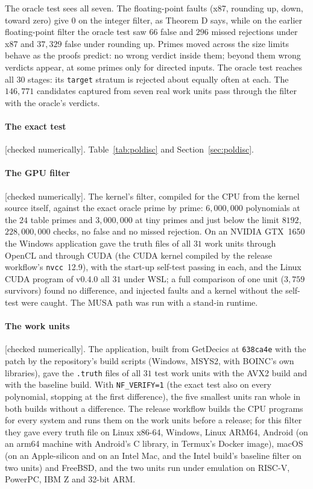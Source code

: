 \documentclass[10pt,a4paper]{article}
\newcommand{\code}[1]{\texttt{#1}}
\newcommand{\stnum}{\textsf{\small[checked numerically]}\xspace}
\theoremstyle{plain}
\theoremstyle{definition}
\begin{document}
The oracle test sees all seven.  The floating-point faults (x87, rounding up, down, toward zero) give $0$ on the integer filter, as Theorem D says, while on the
earlier floating-point filter the oracle test saw $66$ false and $296$ missed rejections under x87 and $37{,}329$ false under rounding up.  Primes moved across the size
limits behave as the proofs predict: no wrong verdict inside them; beyond them wrong verdicts appear, at some primes only for directed inputs.  The oracle test
reaches all $30$ stages: its \code{target} stratum is rejected about equally often at each.  The $146{,}771$ candidates captured from seven real work units pass
through the filter with the oracle's verdicts.

\paragraph{The exact test} \stnum.  Table~\ref{tab:poldisc} and Section~\ref{sec:poldisc}.

\paragraph{The GPU filter} \stnum.  The kernel's filter, compiled for the CPU from the kernel source itself, against the exact oracle prime by prime:
$6{,}000{,}000$ polynomials at the $24$ table primes and $3{,}000{,}000$ at tiny primes and just below the limit $8192$, $228{,}000{,}000$ checks, no false and no
missed rejection.  On an NVIDIA GTX~1650 the Windows application gave the truth files of all $31$ work units through OpenCL and through CUDA (the CUDA kernel
compiled by the release workflow's \code{nvcc}~12.9), with the start-up self-test passing in each, and the Linux CUDA program of v0.4.0 all $31$ under WSL; a full
comparison of one unit ($3{,}759$ survivors) found no difference, and injected faults and a kernel without the self-test were caught.  The MUSA path was run with a
stand-in runtime.

\paragraph{The work units} \stnum.  The application, built from GetDecics at \code{638ca4e} with the patch by the repository's build scripts (Windows, MSYS2, with
BOINC's own libraries), gave the \code{.truth} files of all $31$ test work units with the AVX2 build and with the baseline build.  With \code{NF\_VERIFY=1} (the exact
test also on every polynomial, stopping at the first difference), the five smallest units ran whole in both builds without a difference.  The release workflow
builds the CPU programs for every system and runs them on the work units before a release; for this filter they gave every truth file on Linux x86-64,
Windows, Linux ARM64, Android (on an arm64 machine with Android's C library, in Termux's Docker image), macOS (on an Apple-silicon and on an Intel Mac, and the
Intel build's baseline filter on two units) and FreeBSD, and the two units run under emulation on RISC-V, PowerPC, IBM Z and 32-bit ARM.
\end{document}
